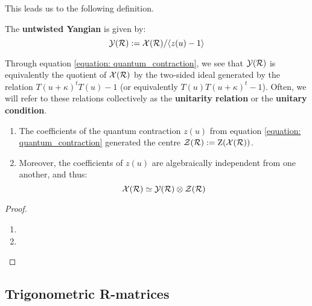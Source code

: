         This leads us to the following definition.
        \begin{definition} \label{def: untwisted_yangians}
            The \textbf{untwisted Yangian} is given by:
                $$\mathcal{Y}(\mathcal{R}) := \mathcal{X}(\mathcal{R})/\langle z(u) - 1\rangle$$
        \end{definition}
        \begin{remark}[Unitarity]
            Through equation \eqref{equation: quantum_contraction}, we see that $\mathcal{Y}(\mathcal{R})$ is equivalently the quotient of $\mathcal{X}(\mathcal{R})$ by the two-sided ideal generated by the relation $T(u + \kappa)^t T(u) - 1$ (or equivalently $T(u) T(u + \kappa)^t - 1$). Often, we will refer to these relations collectively as the \textbf{unitarity relation} or the \textbf{unitary condition}.
        \end{remark}
        \begin{lemma} \label{lemma: centres_of_extended_untwisted_yangians}
            \begin{enumerate}
                \item The coefficients of the quantum contraction $z(u)$ from equation \eqref{equation: quantum_contraction} generated the centre $\mathcal{Z}(\mathcal{R}) := \mathrm{Z}( \mathcal{X}(\mathcal{R}) )$.
                \item Moreover, the coefficients of $z(u)$ are algebraically independent from one another, and thus:
                    $$\calX(\calR) \cong \calY(\calR) \tensor \calZ(\calR)$$
            \end{enumerate}
        \end{lemma}
            \begin{proof}
                \begin{enumerate}
                    \item 
                    \item 
                \end{enumerate}
            \end{proof}

    \subsection{Trigonometric R-matrices}

